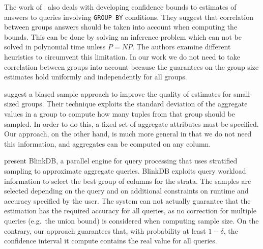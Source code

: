The work of~\citet{XuJD08} also deals with developing confidence bounds
to estimates of answers to queries involving \texttt{GROUP BY} conditions. They
suggest that correlation between groups answers should be taken into account
when computing the bounds. This can be done by solving an inference problem
which can not be solved in polynomial time unless $P=NP$. The authors examine
different heuristics to circumvent this limitation. In our work we do not need
to take correlation between groups into account because the guarantees on the
group size estimates hold uniformly and independently for all groups.

\citet{RoschL09} suggest a biased sample approach to improve
the quality of estimates for small-sized groups. Their technique exploits the
standard deviation of the aggregate values in a group to compute how many tuples
from that group should be sampled. In order to do this, a fixed set of aggregate
attributes must be specified. Our approach, on the other hand, is much more
general in that we do not need this information, and aggregates can be computed
on any column.

\citet{AgarwalMPMMS13} present BlinkDB, a parallel engine for query processing
that uses stratified sampling to approximate aggregate queries. BlinkDB exploits
query workload information to select the best group of columns for the strata.
The samples are selected depending on the query and on additional constraints on
runtime and accuracy specified by the user. The system can not actually
guarantee that the estimation has the required accuracy for all queries, as no
correction for multiple queries (e.g.~the union bound) is considered when
computing sample size. On the contrary, our approach guarantees that, with
probability at least $1-\delta$, the confidence interval it compute contains the
real value for all queries.

